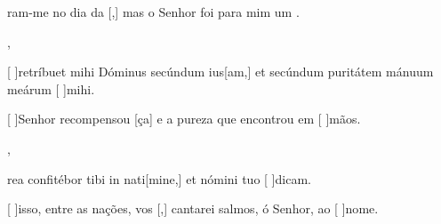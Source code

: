 {    {\item {}ram-me no dia da [,] mas o Senhor foi para mim um .~\Antiphona},
  {\item {}[ ]{re}tríbuet mihi Dóminus secúndum ius[am,] et secúndum puritátem mánuum meárum [ ]{mi}hi.~\Antiphona}%
    {\item {}[ ]{Se}nhor recompensou [ça] e a pureza que encontrou em [ ]{mãos}.~\Antiphona},
  {\item {}rea confitébor tibi in nati[mine,] et nómini tuo [ ]{di}cam.~\Antiphona}%
    {\item {}[ ]{is}so, entre as nações, vos [,] cantarei salmos, ó Senhor, ao [ ]{no}me.~\Antiphona}
}